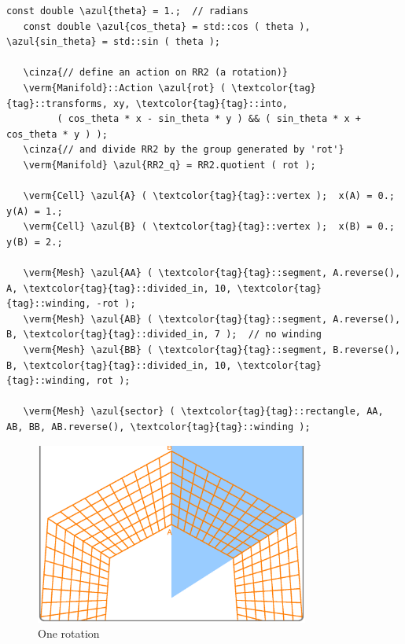 \begin{Verbatim}[commandchars=\\\{\},formatcom=\small\tt,frame=single,
   label=parag-\ref{\numb section 7.\numb parag 11}.cpp,rulecolor=\color{coment},
   baselinestretch=0.94,framesep=2mm                                             ]
   const double \azul{theta} = 1.;  // radians
   const double \azul{cos_theta} = std::cos ( theta ), \azul{sin_theta} = std::sin ( theta );
	
   \cinza{// define an action on RR2 (a rotation)}
   \verm{Manifold}::Action \azul{rot} ( \textcolor{tag}{tag}::transforms, xy, \textcolor{tag}{tag}::into,
         ( cos_theta * x - sin_theta * y ) && ( sin_theta * x + cos_theta * y ) );
   \cinza{// and divide RR2 by the group generated by 'rot'}
   \verm{Manifold} \azul{RR2_q} = RR2.quotient ( rot );

   \verm{Cell} \azul{A} ( \textcolor{tag}{tag}::vertex );  x(A) = 0.;  y(A) = 1.;
   \verm{Cell} \azul{B} ( \textcolor{tag}{tag}::vertex );  x(B) = 0.;  y(B) = 2.;

   \verm{Mesh} \azul{AA} ( \textcolor{tag}{tag}::segment, A.reverse(), A, \textcolor{tag}{tag}::divided_in, 10, \textcolor{tag}{tag}::winding, -rot );
   \verm{Mesh} \azul{AB} ( \textcolor{tag}{tag}::segment, A.reverse(), B, \textcolor{tag}{tag}::divided_in, 7 );  // no winding
   \verm{Mesh} \azul{BB} ( \textcolor{tag}{tag}::segment, B.reverse(), B, \textcolor{tag}{tag}::divided_in, 10, \textcolor{tag}{tag}::winding, rot );

   \verm{Mesh} \azul{sector} ( \textcolor{tag}{tag}::rectangle, AA, AB, BB, AB.reverse(), \textcolor{tag}{tag}::winding );
\end{Verbatim}

\begin{figure}[ht] \centering
  \includegraphics[width=90mm]{sector-1.eps}
  \caption{One rotation}
  \label{\numb section 7.\numb fig 7}
\end{figure}

